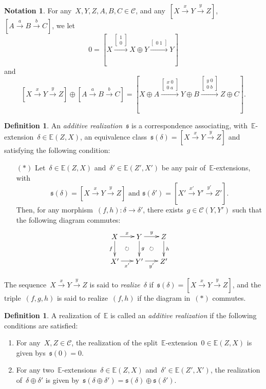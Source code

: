 \documentclass{amsart}
\theoremstyle{definition}
\newtheorem{definition}[theorem]{Definition}
\newtheorem{notation}[theorem]{Notation}
\newcommand{\darkblue}{\color{darkblue}} %
\newcommand{\defn}[1]{\textsl{\darkblue #1}} %
\newcommand{\cat}{\mathcal{C}}
\newcommand{\bsm}{\begin{smallmatrix}}
\newcommand{\esm}{\end{smallmatrix}}
\begin{document}
\begin{notation}
For any~$X,Y,Z,A,B,C\in\cat$, and any~$[X \xrightarrow{x} Y \xrightarrow{y} Z]$,~$[A \xrightarrow{a} B \xrightarrow{b} C]$, we let
\[ 0=[X\overset{\left[\bsm1\\0\esm\right]}{\longrightarrow} X\oplus Y \overset{\left[\bsm0\;1\esm\right]}{\longrightarrow} Y]
\]
and
\[
[X \xrightarrow{x} Y \xrightarrow{y} Z]\oplus [A \xrightarrow{a} B \xrightarrow{b} C] = [X\oplus A \overset{\left[\bsm x \; 0 \\ 0\; a\esm\right]}{\longrightarrow} Y\oplus B \overset{\left[\bsm y\;0\\0\;b \esm\right]}{\longrightarrow} Z\oplus C].
\]
\end{notation}

\begin{definition}
An \defn{additive realization}~$\mathfrak{s}$ is a correspondence associating, with~$\mathbb{E}$-extension~$\delta\in\mathbb{E}(Z,X)$, an equivalence class~$\mathfrak{s}(\delta)=[X\xrightarrow{x}Y\xrightarrow{y}Z]$ and satisfying the following condition: 
\begin{itemize}
\item[$(\ast)$] Let~$\delta\in\mathbb{E}(Z,X)$ and~$\delta'\in\mathbb{E}(Z',X')$ be any pair of~$\mathbb{E}$-extensions, with
\[\mathfrak{s}(\delta)=[X\xrightarrow{x}Y\xrightarrow{y}Z] \text{ and } \mathfrak{s}(\delta')=[X'\xrightarrow{x'}Y'\xrightarrow{y'}Z'].\]
Then, for any morphism~$(f,h):\delta\to\delta'$, there exists~$g\in\cat(Y,Y')$ such that the following diagram commutes:
\[
\xy
(-12,6)*+{X}="0";
(0,6)*+{Y}="2";
(12,6)*+{Z}="4";
%
(-12,-6)*+{X'}="10";
(0,-6)*+{Y'}="12";
(12,-6)*+{Z'}="14";
%
{\ar^{x} "0";"2"};
{\ar^{y} "2";"4"};
%
{\ar_{f} "0";"10"};
{\ar^{g} "2";"12"};
{\ar^{h} "4";"14"};
%
{\ar_{x'} "10";"12"};
{\ar_{y'} "12";"14"};
%
{\ar@{}|{} "0";"12"};
{\ar@{}|{} "2";"14"};
%
{\ar@{}|\circlearrowright "0";"12"};
{\ar@{}|\circlearrowright "2";"14"};
\endxy
\]
\end{itemize}

The sequence~$X\xrightarrow{x}Y\xrightarrow{y}Z$ is said to \defn{realize}~$\delta$ if~$\mathfrak{s}(\delta)=[X\xrightarrow{x}Y\xrightarrow{y}Z]$, and the triple~$(f,g,h)$ is said to realize~$(f,h)$ if the diagram in~$(\ast)$ commutes.
\end{definition}


\begin{definition}
A realization of~$\mathbb{E}$ is called an \defn{additive realization} if the following conditions are satisfied:
\begin{enumerate}
\item For any~$X,Z\in\cat$, the realization of the split~$\mathbb{E}$-extension~$0\in\mathbb{E}(Z,X)$ is given bys~$\mathfrak{s}(0)=0$.
\item For any two~$\mathbb{E}$-extensions~$\delta\in\mathbb{E}(Z,X)$ and~$\delta'\in\mathbb{E}(Z',X')$, the realization of~$\delta\oplus\delta'$ is given by~$\mathfrak{s}(\delta\oplus\delta')=\mathfrak{s}(\delta)\oplus\mathfrak{s}(\delta')$.
\end{enumerate}
\end{definition}
\end{document}

